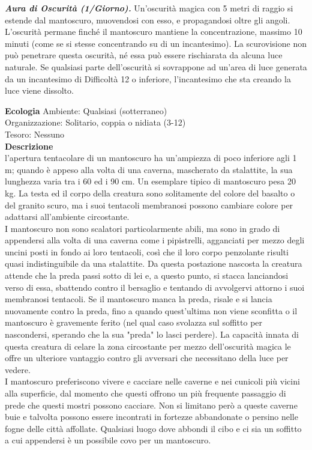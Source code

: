 \begin{multicols}{2}
\emph{\textbf{Aura di Oscurità (1/Giorno).}} Un'oscurità magica con 5 metri di raggio si estende dal mantoscuro, muovendosi con esso, e propagandosi oltre gli angoli. L'oscurità permane finché il mantoscuro mantiene la concentrazione, massimo 10 minuti (come se si stesse concentrando su di un incantesimo). La scurovisione non può penetrare questa oscurità, né essa può essere rischiarata da alcuna luce naturale. Se qualsiasi parte dell'oscurità si sovrappone ad un'area di luce generata da un incantesimo di Difficoltà 12 o inferiore, l'incantesimo che sta creando la luce viene dissolto.

\textbf{Ecologia}
Ambiente: Qualsiasi (sotterraneo)\\
Organizzazione: Solitario, coppia o nidiata (3-12)\\
Tesoro: Nessuno\\
\textbf{Descrizione}\\
l'apertura tentacolare di un mantoscuro ha un'ampiezza di poco inferiore agli 1 m; quando è appeso alla volta di una caverna, mascherato da stalattite, la sua lunghezza varia tra i 60 ed i 90 cm. Un esemplare tipico di mantoscuro pesa 20 kg. La testa ed il corpo della creatura sono solitamente del colore del basalto o del granito scuro, ma i suoi tentacoli membranosi possono cambiare colore per adattarsi all'ambiente circostante.\\

I mantoscuro non sono scalatori particolarmente abili, ma sono in grado di appendersi alla volta di una caverna come i pipistrelli, agganciati per mezzo degli uncini posti in fondo ai loro tentacoli, così che il loro corpo penzolante risulti quasi indistinguibile da una stalattite. Da questa postazione nascosta la creatura attende che la preda passi sotto di lei e, a questo punto, si stacca lanciandosi verso di essa, sbattendo contro il bersaglio e tentando di avvolgervi attorno i suoi membranosi tentacoli. Se il mantoscuro manca la preda, risale e si lancia nuovamente contro la preda, fino a quando quest'ultima non viene sconfitta o il mantoscuro è gravemente ferito (nel qual caso svolazza sul soffitto per nascondersi, sperando che la sua "preda" lo lasci perdere). La capacità innata di questa creatura di celare la zona circostante per mezzo dell'oscurità magica le offre un ulteriore vantaggio contro gli avversari che necessitano della luce per vedere.\\

I mantoscuro preferiscono vivere e cacciare nelle caverne e nei cunicoli più vicini alla superficie, dal momento che questi offrono un più frequente passaggio di prede che questi mostri possono cacciare. Non si limitano però a queste caverne buie e talvolta possono essere incontrati in fortezze abbandonate o persino nelle fogne delle città affollate. Qualsiasi luogo dove abbondi il cibo e ci sia un soffitto a cui appendersi è un possibile covo per un mantoscuro.\\


\end{multicols}
